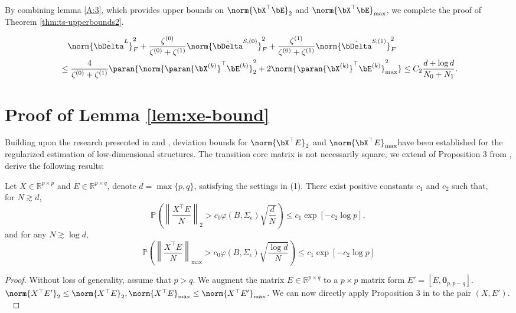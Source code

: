      By combining lemma \ref{A:3}, which provides upper bounds on 
    $\norm{\bX^{\top}\bE}_2$ and $\norm{\bX^{\top}\bE}_{\max}$, we complete the proof of Theorem \ref{thm:ts-upperbounds2}.

     \begin{equation}
     \begin{aligned}
	 &\quad\norm{\hat\bDelta^L}_F^2+\dfrac{\zeta^{(0)}}{\zeta^{(0)}+ \zeta^{(1)}}\norm{\hat\bDelta^{S, (0)}}_F^2+\dfrac{\zeta^{(1)}}{\zeta^{(0)}+ \zeta^{(1)}}\norm{\hat\bDelta^{S, (1)}}_F^2\\
     &\leq \frac{4}{\zeta^{(0)}+\zeta^{(1)}}\paran{\norm{\paran{\bX^{(k)}}^\top \bE^{(k)}}_2^2+2\norm{\paran{\bX^{(k)}}^\top \bE^{(k)}}_{\max}^2}
     \leq C_2\frac{d+\log d}{N_0+N_1}.
     \end{aligned}
     \end{equation}

 \section*{Proof of Lemma \ref{lem:xe-bound}}
 \label{A:3}
Building upon the research presented in \cite{basu2015regularized} and \cite{basu2019low}, deviation bounds for $\norm{\bX^{\top}E}_2$ and $\norm{\bX^{\top}E}_{\max}$have been established for the regularized estimation of low-dimensional structures. The transition core matrix is not necessarily square, we extend of Proposition 3 from \cite{basu2019low},  derive the following results:
\begin{lemma}
Let $X \in \mathbb{R}^{p \times p}$ and $E \in \mathbb{R}^{p \times q}$, denote $d = \max\{p,q\}$, satisfying the settings in (1). There exist positive constants $c_1$ and $c_2$ such that,\\
for $N \gtrsim d$, 
 $$\mathbb{P}\left( \left\| \frac{X^\top E}{N} \right\|_2 > c_0 \varphi(B, \Sigma_{\epsilon})\sqrt{\frac{d}{N}} \right) \leq c_1 \exp \left[-c_2 \log p\right],$$
and for any  $N \gtrsim \log d$, 
$$\mathbb{P}\left( \left\| \frac{X^\top E}{N} \right\|_{\max} > c_0 \varphi(B, \Sigma_{\epsilon})\sqrt{\frac{\log d}{N}} \right) \leq c_1 \exp \left[-c_2 \log p\right]$$
\label{lem:xe-bound}
\end{lemma}

\begin{proof}
 Without loss of generality, assume that $p > q$. We augment the matrix $E \in \mathbb{R}^{p \times q}$ to a $p \times p$ matrix form $E' = [E, \mathbf{0}_{p,p-q}]$. $\norm{X^{\top}E'}_2\leq \norm{X^{\top}E}_2,\norm{X^{\top}E}_{\max}\leq \norm{X^{\top}E'}_{\max}$. We can now directly apply Proposition 3 in \cite{basu2019low} to the pair $(X, E')$.
\   
\end{proof}
 
